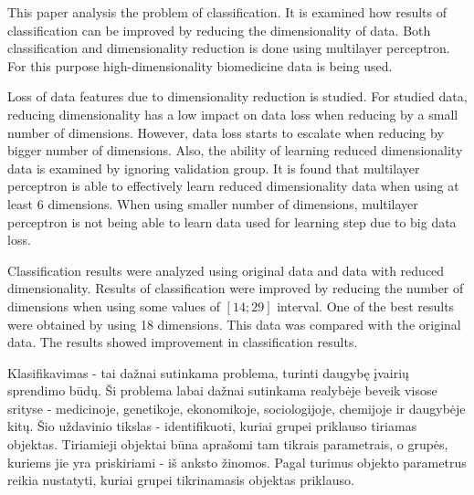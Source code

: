 \documentclass{VUMIFPSbakalaurinis}
\begin{document}
This paper analysis the problem of classification.
It is examined how results of classification can be improved by reducing the dimensionality of data.
Both classification and dimensionality reduction is done using multilayer perceptron.
For this purpose high-dimensionality biomedicine data is being used.

Loss of data features due to dimensionality reduction is studied.
For studied data, reducing dimensionality has a low impact on data loss when reducing by a small number of dimensions.
However, data loss starts to escalate when reducing by bigger number of dimensions.
Also, the ability of learning reduced dimensionality data is examined by ignoring validation group.
It is found that multilayer perceptron is able to effectively learn reduced dimensionality data when using at least 6 dimensions.
When using smaller number of dimensions, multilayer perceptron is not being able to learn data used for learning step due to big data loss.

Classification results were analyzed using original data and data with reduced dimensionality.
Results of classification were improved by reducing the number of dimensions when using some values of $[14; 29]$ interval.
One of the best results were obtained by using 18 dimensions.
This data was compared with the original data.
The results showed improvement in classification results.




\clearpage
\tableofcontents









Klasifikavimas - tai dažnai sutinkama problema, turinti daugybę įvairių sprendimo būdų.
Ši problema labai dažnai sutinkama realybėje beveik visose srityse - medicinoje, genetikoje, ekonomikoje, sociologijoje, chemijoje ir daugybėje kitų.
Šio uždavinio tikslas - identifikuoti, kuriai grupei priklauso tiriamas objektas.
Tiriamieji objektai būna aprašomi tam tikrais parametrais, o grupės, kuriems jie yra priskiriami - iš anksto žinomos.
Pagal turimus objekto parametrus reikia nustatyti, kuriai grupei tikrinamasis objektas priklauso.
\end{document}
